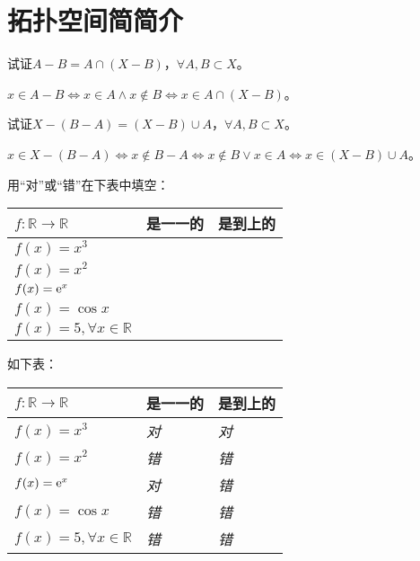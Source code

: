 \chapter{拓扑空间简简介}

\begin{xiti}
	\item 试证$\displaystyle A-B=A\cap (X-B)$，$\displaystyle \forall A,B\subset X$。
	
	\begin{zm}
			$  x\in A-B \iff x\in A \wedge x\notin B\iff x\in A\cap (X-B) $。 
	\end{zm}
	
	\item 试证$X-(B-A)=(X-B)\cup A$，$ \forall A,B\subset X$。
	
	\begin{zm}
		$ x\in X-(B-A) \iff x\notin B-A \iff x\notin B \vee x\in A \iff x\in (X-B)\cup A $。
	\end{zm}
	
	\item 用“对”或“错”在下表中填空：
	\begin{table}[htb]
		\begin{tabularx}{\textwidth}{YYY}
			\toprule
			$f\colon \mathbb{R}\rightarrow \mathbb{R} $&是一一的&是到上的\\
			\midrule
			$f(x)=x^3 $& & \\
			$f(x)=x^2$& &\\
			$f(x)=\mathrm{e}^{x}$&&\\
			$f(x)=\cos x$&&\\
			$f(x)=5,\forall x\in \mathbb{R}$&&\\
			\bottomrule
		\end{tabularx}
	\end{table}
	
	\begin{jie}
		如下表：
		\begin{table}[htb]
			\begin{tabularx}{\textwidth}{YYY}
				\toprule
				$f\colon \mathbb{R}\rightarrow \mathbb{R} $&是一一的&是到上的\\
				\midrule
				$f(x)=x^3$&\textit{对} &\textit{对}\\
				$f(x)=x^2 $&\textit{错} &\textit{错}\\
				$f(x)=\mathrm{e}^{x}$&\textit{对}&\textit{错}\\
				$f(x)=\cos x$&\textit{错}&\textit{错}\\
				$f(x)=5,\forall x\in \mathbb{R}$&\textit{错}&\textit{错}\\
				\bottomrule
			\end{tabularx}
		\end{table}
	\end{jie}
	

\end{xiti}
